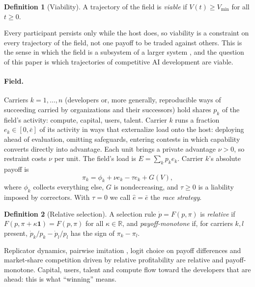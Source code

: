 \documentclass[letterpaper]{article} %
\theoremstyle{definition}
\newtheorem{definition}{Definition}
\newcommand{\Vmin}{V_{\min}}
\begin{document}
\begin{definition}[Viability]\label{def:viable}
A trajectory of the field is \emph{viable} if $V(t)\ge\Vmin$ for all $t\ge0$.
\end{definition}

Every participant persists only while the host does, so viability is a constraint on every trajectory of the field, not one payoff to be traded against others. This is the sense in which the field is a subsystem of a larger system \citep{aubin1991,rockstrom2009,wced1987}, and the question of this paper is which trajectories of competitive AI development are viable.

\paragraph{Field.} Carriers $k=1,\dots,n$ (developers or, more generally, reproducible ways of succeeding carried by organizations and their successors) hold shares $p_k$ of the field's activity: compute, capital, users, talent. Carrier $k$ runs a fraction $e_k\in[0,\bar e]$ of its activity in ways that externalize load onto the host: deploying ahead of evaluation, omitting safeguards, entering contests in which capability converts directly into advantage. Each unit brings a private advantage $\nu>0$, so restraint costs $\nu$ per unit. The field's load is $E=\sum_kp_ke_k$. Carrier $k$'s absolute payoff is
\begin{equation}\label{eq:pi}
\pi_k=\phi_k+\nu e_k-\tau e_k+G(V),
\end{equation}
where $\phi_k$ collects everything else, $G$ is nondecreasing, and $\tau\ge0$ is a liability imposed by correctors. With $\tau=0$ we call $\hat e=\bar e$ the \emph{race strategy}.

\begin{definition}[Relative selection]\label{def:relsel}
A selection rule $\dot p=F(p,\pi)$ is \emph{relative} if $F(p,\pi+\kappa\mathbf 1)=F(p,\pi)$ for all $\kappa\in\mathbb R$, and \emph{payoff-monotone} if, for carriers $k,l$ present, $\dot p_k/p_k-\dot p_l/p_l$ has the sign of $\pi_k-\pi_l$.
\end{definition}

Replicator dynamics, pairwise imitation \citep{schlag1998}, logit choice on payoff differences and market-share competition driven by relative profitability \citep{alchian1950} are relative and payoff-monotone. Capital, users, talent and compute flow toward the developers that are ahead: this is what ``winning'' means.
\end{document}
